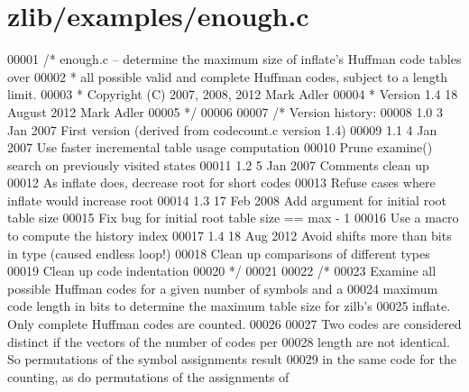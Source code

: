 \hypertarget{zlib_2examples_2enough_8c_source}{}\section{zlib/examples/enough.c}
\label{zlib_2examples_2enough_8c_source}

\begin{DoxyCode}
00001 \textcolor{comment}{/* enough.c -- determine the maximum size of inflate's Huffman code tables over}
00002 \textcolor{comment}{ * all possible valid and complete Huffman codes, subject to a length limit.}
00003 \textcolor{comment}{ * Copyright (C) 2007, 2008, 2012 Mark Adler}
00004 \textcolor{comment}{ * Version 1.4  18 August 2012  Mark Adler}
00005 \textcolor{comment}{ */}
00006 
00007 \textcolor{comment}{/* Version history:}
00008 \textcolor{comment}{   1.0   3 Jan 2007  First version (derived from codecount.c version 1.4)}
00009 \textcolor{comment}{   1.1   4 Jan 2007  Use faster incremental table usage computation}
00010 \textcolor{comment}{                     Prune examine() search on previously visited states}
00011 \textcolor{comment}{   1.2   5 Jan 2007  Comments clean up}
00012 \textcolor{comment}{                     As inflate does, decrease root for short codes}
00013 \textcolor{comment}{                     Refuse cases where inflate would increase root}
00014 \textcolor{comment}{   1.3  17 Feb 2008  Add argument for initial root table size}
00015 \textcolor{comment}{                     Fix bug for initial root table size == max - 1}
00016 \textcolor{comment}{                     Use a macro to compute the history index}
00017 \textcolor{comment}{   1.4  18 Aug 2012  Avoid shifts more than bits in type (caused endless loop!)}
00018 \textcolor{comment}{                     Clean up comparisons of different types}
00019 \textcolor{comment}{                     Clean up code indentation}
00020 \textcolor{comment}{ */}
00021 
00022 \textcolor{comment}{/*}
00023 \textcolor{comment}{   Examine all possible Huffman codes for a given number of symbols and a}
00024 \textcolor{comment}{   maximum code length in bits to determine the maximum table size for zilb's}
00025 \textcolor{comment}{   inflate.  Only complete Huffman codes are counted.}
00026 \textcolor{comment}{}
00027 \textcolor{comment}{   Two codes are considered distinct if the vectors of the number of codes per}
00028 \textcolor{comment}{   length are not identical.  So permutations of the symbol assignments result}
00029 \textcolor{comment}{   in the same code for the counting, as do permutations of the assignments of}

\end{DoxyCode}

